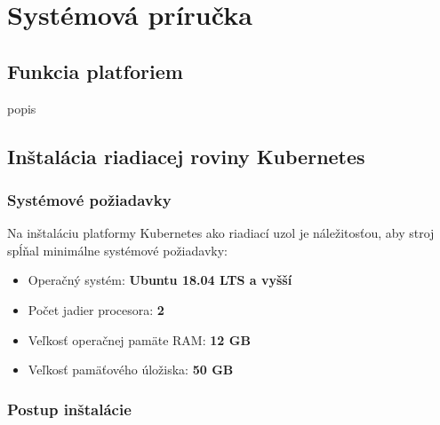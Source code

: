 
\chapter{Systémová príručka}

\section{Funkcia platforiem}

popis

\section{Inštalácia riadiacej roviny Kubernetes}

\subsection*{Systémové požiadavky}

Na inštaláciu platformy Kubernetes ako riadiací uzol je náležitosťou, aby stroj spĺňal minimálne systémové požiadavky:

\begin{itemize}
    \item Operačný systém: \textbf{Ubuntu 18.04 LTS a vyšší}
	\item Počet jadier procesora: \textbf{2}
    \item Veľkosť operačnej pamäte RAM: \textbf{12 GB}
    \item Veľkosť pamäťového úložiska: \textbf{50 GB}
\end{itemize}

\subsection*{Postup inštalácie}
\label{sec:hello}

